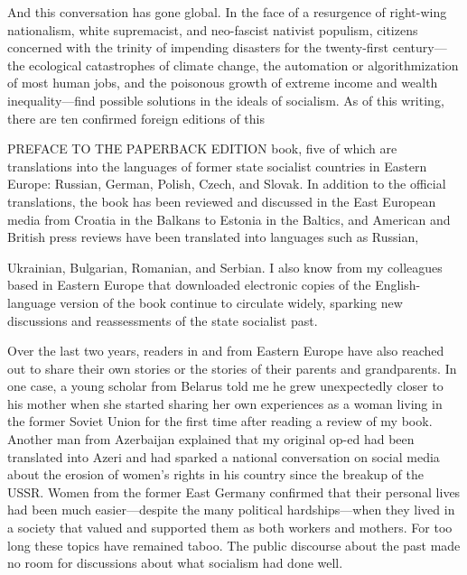  \par 
And this conversation has gone global. In the face of a resurgence of right-wing nationalism, white supremacist, and neo-fascist nativist populism, citizens concerned with the trinity of impending disasters for the twenty-first century—the ecological catastrophes of climate change, the automation or algorithmization of most human jobs, and the poisonous growth of extreme income and wealth inequality—find possible solutions in the ideals of socialism. As of this writing, there are ten confirmed foreign editions of this
 \par 
PREFACE TO THE PAPERBACK EDITION book, five of which are translations into the languages of former state socialist countries in Eastern Europe: Russian, German, Polish, Czech, and Slovak. In addition to the official translations, the book has been reviewed and discussed in the East European media from Croatia in the Balkans to Estonia in the Baltics, and American and British press reviews have been translated into languages such as Russian,
 \par 
Ukrainian, Bulgarian, Romanian, and Serbian. I also know from my colleagues based in Eastern Europe that downloaded electronic copies of the English-language version of the book continue to circulate widely, sparking new discussions and reassessments of the state socialist past.
 \par 
Over the last two years, readers in and from Eastern Europe have also reached out to share their own stories or the stories of their parents and grandparents. In one case, a young scholar from Belarus told me he grew unexpectedly closer to his mother when she started sharing her own experiences as a woman living in the former Soviet Union for the first time after reading a review of my book. Another man from Azerbaijan explained that my original op-ed had been translated into Azeri and had sparked a national conversation on social media about the erosion of women’s rights in his country since the breakup of the USSR. Women from the former East Germany confirmed that their personal lives had been much easier—despite the many political hardships—when they lived in a society that valued and supported them as both workers and mothers. For too long these topics have remained taboo. The public discourse about the past made no room for discussions about what socialism had done well.
 \par 
